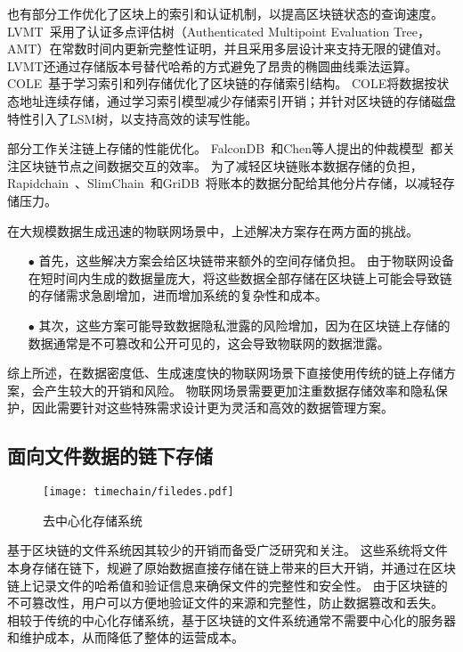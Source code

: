 也有部分工作优化了区块上的索引和认证机制，以提高区块链状态的查询速度。
LVMT~\cite{li2023lvmt}采用了认证多点评估树（Authenticated Multipoint Evaluation Tree，AMT）在常数时间内更新完整性证明，并且采用多层设计来支持无限的键值对。
LVMT还通过存储版本号替代哈希的方式避免了昂贵的椭圆曲线乘法运算。
COLE~\cite{zhang2024cole}基于学习索引和列存储优化了区块链的存储索引结构。
COLE将数据按状态地址连续存储，通过学习索引模型减少存储索引开销；并针对区块链的存储磁盘特性引入了LSM树，以支持高效的读写性能。

部分工作关注链上存储的性能优化。
FalconDB~\cite{peng2020falcondb}和Chen等人提出的仲裁模型~\cite{chen2022blockchain}都关注区块链节点之间数据交互的效率。
为了减轻区块链账本数据存储的负担，Rapidchain~\cite{zamani2018rapidchain}、SlimChain~\cite{xu2021slimchain}和GriDB~\cite{hong2023gridb}将账本的数据分配给其他分片存储，以减轻存储压力。

在大规模数据生成迅速的物联网场景中，上述解决方案存在两方面的挑战。

\begin{itemize}
    \item[$\bullet$] 首先，这些解决方案会给区块链带来额外的空间存储负担。
    由于物联网设备在短时间内生成的数据量庞大，将这些数据全部存储在区块链上可能会导致链的存储需求急剧增加，进而增加系统的复杂性和成本。
    \item[$\bullet$] 其次，这些方案可能导致数据隐私泄露的风险增加，因为在区块链上存储的数据通常是不可篡改和公开可见的，这会导致物联网的数据泄露。
\end{itemize}

综上所述，在数据密度低、生成速度快的物联网场景下直接使用传统的链上存储方案，会产生较大的开销和风险。
物联网场景需要更加注重数据存储效率和隐私保护，因此需要针对这些特殊需求设计更为灵活和高效的数据管理方案。

\subsection{面向文件数据的链下存储}
\begin{figure}[t]
    \centering
    \texttt{[image: timechain/filedes.pdf]}
    \caption{去中心化存储系统}
    \label{fig:filedes}
\end{figure}

基于区块链的文件系统因其较少的开销而备受广泛研究和关注。
这些系统将文件本身存储在链下，规避了原始数据直接存储在链上带来的巨大开销，并通过在区块链上记录文件的哈希值和验证信息来确保文件的完整性和安全性。
由于区块链的不可篡改性，用户可以方便地验证文件的来源和完整性，防止数据篡改和丢失。
相较于传统的中心化存储系统，基于区块链的文件系统通常不需要中心化的服务器和维护成本，从而降低了整体的运营成本。

